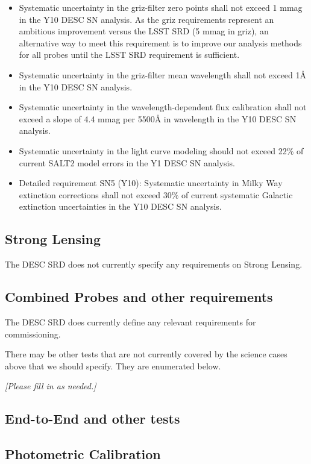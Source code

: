 \documentclass[modern]{desc-tex/styles/lsstdescnote}
\begin{document}
\begin{itemize}
\item Systematic uncertainty in the griz-filter zero points shall not exceed 1 mmag in the Y10 DESC SN analysis. As the griz requirements represent an ambitious improvement versus the LSST SRD (5 mmag in griz), an alternative way to meet this requirement is to improve our analysis methods for all probes until the LSST SRD requirement is sufficient.
\item Systematic uncertainty in the griz-filter mean wavelength shall not exceed 1\AA{} in the Y10 DESC SN analysis.
\item  Systematic uncertainty in the wavelength-dependent flux calibration shall not exceed a slope of 4.4 mmag per 5500\AA{} in wavelength in the Y10 DESC SN analysis.
\item Systematic uncertainty in the light curve modeling should not exceed 22\% of current SALT2 model errors in the Y1 DESC SN analysis.
\item Detailed requirement SN5 (Y10): Systematic uncertainty in Milky Way extinction corrections shall not exceed 30\% of current systematic Galactic extinction uncertainties in the Y10 DESC SN analysis.
\end{itemize}


\subsection{Strong Lensing}

The DESC SRD does not currently specify any requirements on Strong Lensing.

\subsection{Combined Probes and other requirements}

The DESC SRD does currently define any relevant requirements for commissioning.

\vspace{1.0in}

There may be other tests that are not currently covered by the science cases above that we should specify.  They are enumerated below.

{\it [Please fill in as needed.]}

\subsection{End-to-End and other tests}
\subsection{Photometric Calibration}
\end{document}
